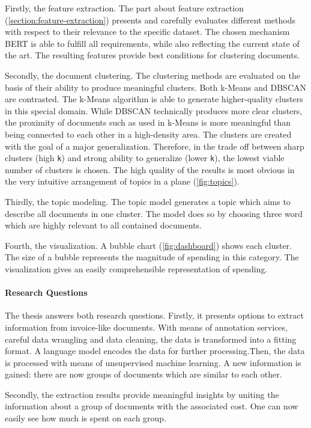 Firstly, the feature extraction. The part about feature extraction (\ref{section:feature-extraction}) presents and carefully evaluates different methods with respect to their relevance to the specific dataset. The chosen mechanism \ac{BERT} is able to fulfill all requirements, while also reflecting the current state of the art. The resulting features provide best conditions for clustering documents.

Secondly, the document clustering.
The clustering methods are evaluated on the basis of their ability to produce meaningful clusters. 
Both k-Means and \ac{DBSCAN} are contrasted. 
The k-Means algorithm is able to generate higher-quality clusters in this special domain. While \ac{DBSCAN} technically produces more clear clusters, the proximity of documents such as used in k-Means is more meaningful than being connected to each other in a high-density area.
The clusters are created with the goal of a major generalization. Therefore, in the trade off between sharp clusters (high \lstinline|k|) and strong ability to generalize (lower \lstinline|k|), the lowest viable number of clusters is chosen. The high quality of the results is most obvious in the very intuitive arrangement of topics in a plane (\ref{fig:topics}).

Thirdly, the topic modeling.
The topic model generates a topic which aims to describe all documents in one cluster. The model does so by choosing three word which are highly relevant to all contained documents. 

Fourth, the visualization.
A bubble chart (\ref{fig:dashboard}) shows each cluster. The size of a bubble represents the magnitude of spending in this category.
The visualization gives an easily comprehensible representation of spending. 

\paragraph{Research Questions}
The thesis answers both research questions. Firstly, it presents options to extract information from invoice-like documents. With means of annotation services, careful data wrangling and data cleaning, the data is transformed into a fitting format. A language model encodes the data for further processing.Then, the data is processed with means of unsupervised machine learning. A new information is gained: there are now groups of documents which are similar to each other.

Secondly, the extraction results provide meaningful insights by uniting the information about a group of documents with the associated cost. One can now easily see how much is spent on each group.